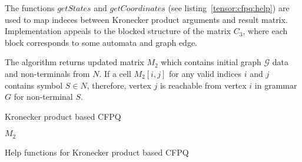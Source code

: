 The functions $getStates$ and $getCoordinates$ (see listing~\ref{tensor:cfpq:help}) are used to map indeces between Kronecker product arguments and result matrix. Implementation appeals to the blocked structure of the matrix $C_3$, where each block corresponds to some automata and graph edge.

The algorithm returns updated matrix $M_2$ which contains initial graph $\mathcal{G}$ data and non-terminals from $N$. If a cell $M_2[i,j]$ for any valid indices $i$ and $j$ contains symbol $S \in N$, therefore, vertex $j$ is reachable from vertex $i$ in grammar $G$ for non-terminal $S$.


\begin{algorithm}[h]
\begin{algorithmic}[1]
\caption{Kronecker product based CFPQ}
\label{tensor:cfpq}
        \EndFor
    \EndFor
                    \EndIf
                \EndIf
           \EndFor
        \EndFor
    \EndWhile
\State \Return $M_2$
\EndFunction
\end{algorithmic}
\end{algorithm}

\begin{algorithm}[h]
\begin{algorithmic}[1]
\caption{Help functions for Kronecker product based CFPQ}
\label{tensor:cfpq:help}
    \State {}
\EndFunction
{}
    \State {}
\EndFunction
\end{algorithmic}
\end{algorithm}

